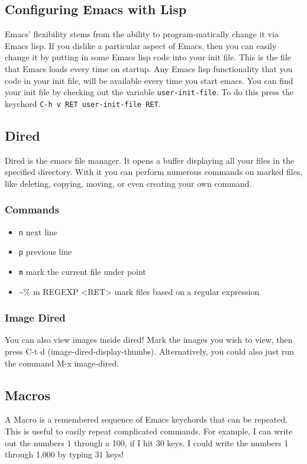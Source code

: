 \documentclass[11pt]{article}
\begin{document}
\subsection{Configuring Emacs with Lisp}
\label{sec:orgheadline8}
Emacs' flexibility stems from the ability to program-matically change it via Emacs lisp.  If you dislike a particular aspect of Emacs, then you can easily change it by putting in some Emacs lisp code into your init file.  This is the file that Emacs loads every time on startup.  Any Emacs lisp functionality that you code in your init file, will be available every time you start emacs. You can find your init file by checking out the variable \texttt{user-init-file}.  To do this press the keychord \texttt{C-h v RET user-init-file RET}.
\subsection{Dired}
\label{sec:orgheadline11}
Dired is the emacs file manager.  It opens a buffer displaying all your files in the specified directory.  With it you can perform numerous commands on marked files, like deleting, copying, moving, or even creating your own command.
\subsubsection{Commands}
\label{sec:orgheadline9}
\begin{itemize}
\item \texttt{n} next line
\item \texttt{p} previous line
\item \texttt{m} mark the current file under point
\item \textasciitilde{}\% m REGEXP <RET>  mark files based on a regular expression
\end{itemize}
\subsubsection{Image Dired}
\label{sec:orgheadline10}
You can also view images inside dired!  Mark the images you wish to view, then press C-t d (image-dired-display-thumbs). Alternatively, you could also just run the command M-x image-dired.
\subsection{Macros}
\label{sec:orgheadline12}
A Macro is a remembered sequence of Emacs keychords that can be repeated.  This is useful to easily repeat complicated commands.  For example, I can write out the numbers 1 through a 100, if I hit 30 keys.  I could write the numbers 1 through 1,000 by typing 31 keys!
\end{document}
